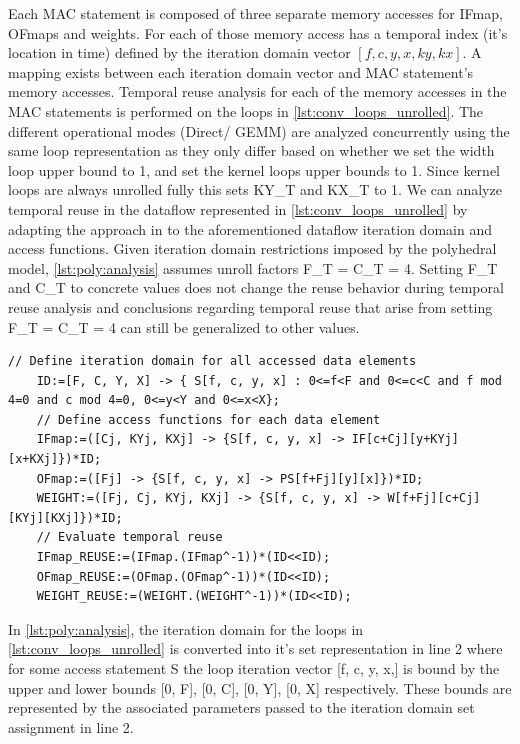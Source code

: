 Each MAC statement is composed of three separate memory accesses for IFmap,
OFmaps and weights. For each of those memory access has a temporal index (it's location in time) defined by the
iteration domain vector $[f, c, y, x, ky, kx]$. A mapping exists between each
iteration domain vector and MAC statement's memory accesses.  
Temporal reuse analysis for each of the memory accesses in the MAC statements is performed on the loops in \autoref{lst:conv_loops_unrolled}. The different
operational modes (Direct/ GEMM) are analyzed concurrently using the same loop
representation as they only differ based on whether we set the width loop
upper bound to 1, and set the kernel loops upper bounds to 1. Since
kernel loops are always unrolled fully this sets KY\_T and KX\_T to 1. We can
analyze temporal reuse in the dataflow represented in
\autoref{lst:conv_loops_unrolled} by adapting the approach in \cite{meeus} 
to the aforementioned dataflow iteration domain and access functions.
Given iteration domain restrictions imposed by the polyhedral model,
\autoref{lst:poly:analysis} assumes unroll factors F\_T =
C\_T = 4. Setting F\_T and C\_T to concrete values does not change the reuse
behavior during temporal reuse analysis and conclusions regarding temporal reuse
that arise from setting F\_T = C\_T = 4 can still be generalized to other values.

\clearpage
\begin{lstlisting}[caption=Polyhedral analysis of reuse in iscc for convolution loops, label={lst:poly:analysis}]
    // Define iteration domain for all accessed data elements
    ID:=[F, C, Y, X] -> { S[f, c, y, x] : 0<=f<F and 0<=c<C and f mod 4=0 and c mod 4=0, 0<=y<Y and 0<=x<X};
    // Define access functions for each data element
    IFmap:=([Cj, KYj, KXj] -> {S[f, c, y, x] -> IF[c+Cj][y+KYj][x+KXj]})*ID;
    OFmap:=([Fj] -> {S[f, c, y, x] -> PS[f+Fj][y][x]})*ID;
    WEIGHT:=([Fj, Cj, KYj, KXj] -> {S[f, c, y, x] -> W[f+Fj][c+Cj][KYj][KXj]})*ID;
    // Evaluate temporal reuse
    IFmap_REUSE:=(IFmap.(IFmap^-1))*(ID<<ID);
    OFmap_REUSE:=(OFmap.(OFmap^-1))*(ID<<ID);
    WEIGHT_REUSE:=(WEIGHT.(WEIGHT^-1))*(ID<<ID);  

\end{lstlisting}

In \autoref{lst:poly:analysis}, the iteration domain for the loops in
\autoref{lst:conv_loops_unrolled} is converted into it's set representation in
line 2 where for some access statement S the loop iteration vector [f, c, y, x,]
is bound by the upper and lower bounds [0, F], [0, C], [0, Y], [0, X]
respectively. These bounds are represented by the associated parameters passed
to the iteration domain set assignment in line 2. 

